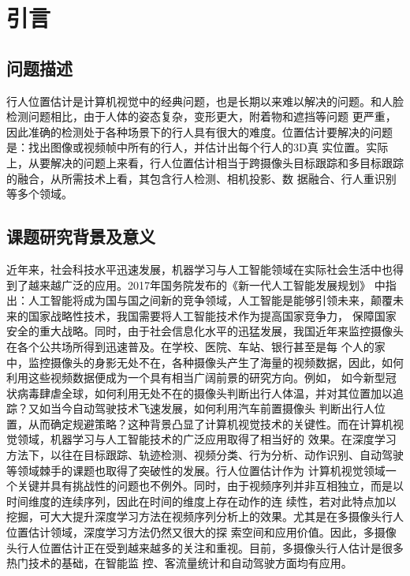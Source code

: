 
\chapter{引言}

\section{问题描述}

行人位置估计是计算机视觉中的经典问题，也是长期以来难以解决的问题。和人脸检测问题相比，由于人体的姿态复杂，变形更大，附着物和遮挡等问题
更严重，因此准确的检测处于各种场景下的行人具有很大的难度。位置估计要解决的问题是：找出图像或视频帧中所有的行人，并估计出每个行人的3D真
实位置。实际上，从要解决的问题上来看，行人位置估计相当于跨摄像头目标跟踪和多目标跟踪的融合，从所需技术上看，其包含行人检测、相机投影、数
据融合、行人重识别等多个领域。


\section{课题研究背景及意义}

近年来，社会科技水平迅速发展，机器学习与人工智能领域在实际社会生活中也得到了越来越广泛的应用。2017年国务院发布的《新一代人工智能发展规划》
中指出：人工智能将成为国与国之间新的竞争领域，人工智能是能够引领未来，颠覆未来的国家战略性技术，我国需要将人工智能技术作为提高国家竞争力，
保障国家安全的重大战略。同时，由于社会信息化水平的迅猛发展，我国近年来监控摄像头在各个公共场所得到迅速普及。在学校、医院、车站、银行甚至是每
个人的家中，监控摄像头的身影无处不在，各种摄像头产生了海量的视频数据，因此，如何利用这些视频数据便成为一个具有相当广阔前景的研究方向。例如，
如今新型冠状病毒肆虐全球，如何利用无处不在的摄像头判断出行人体温，并对其位置加以追踪？又如当今自动驾驶技术飞速发展，如何利用汽车前置摄像头
判断出行人位置，从而确定规避策略？这种背景凸显了计算机视觉技术的关键性。而在计算机视觉领域，机器学习与人工智能技术的广泛应用取得了相当好的
效果。在深度学习方法下，以往在目标跟踪、轨迹检测、视频分类、行为分析、动作识别、自动驾驶等领域棘手的课题也取得了突破性的发展。行人位置估计作为
计算机视觉领域一个关键并具有挑战性的问题也不例外。同时，由于视频序列并非互相独立，而是以时间维度的连续序列，因此在时间的维度上存在动作的连
续性，若对此特点加以挖掘，可大大提升深度学习方法在视频序列分析上的效果。尤其是在多摄像头行人位置估计领域，深度学习方法仍然又很大的探
索空间和应用价值。因此，多摄像头行人位置估计正在受到越来越多的关注和重视。目前，多摄像头行人估计是很多热门技术的基础，在智能监
控、客流量统计和自动驾驶方面均有应用。
	
